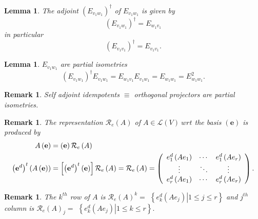 \documentclass[aps,preprint]{revtex4}%
\newtheorem{lemma}[theorem]{Lemma}
\newtheorem{remark}[theorem]{Remark}
\begin{document}
\begin{lemma}
The adjoint $\left(  E_{v_{1}w_{1}}\right)  ^{\dagger}$ of $E_{v_{1}w_{1}}$ is
given by
\begin{equation}
\left(  E_{v_{1}w_{1}}\right)  ^{\dagger}=E_{w_{1}v_{1}}%
\end{equation}
in particular
\begin{equation}
\left(  E_{v_{1}v_{1}}\right)  ^{\dagger}=E_{v_{1}v_{1}}.
\end{equation}

\end{lemma}

\begin{lemma}
$E_{v_{1}w_{1}}$ are partial isometries%
\begin{equation}
\left(  E_{v_{1}w_{1}}\right)  ^{\dagger}E_{v_{1}w_{1}}=E_{w_{1}v_{1}}%
E_{v_{1}w_{1}}=E_{w_{1}w_{1}}=E_{w_{1}w_{1}}^{2}.
\end{equation}

\end{lemma}

\begin{remark}
Self adjoint idempotents $\equiv$ orthogonal projectors are partial isometries.
\end{remark}

\begin{remark}
The representation $\mathcal{R}_{e}\left(  A\right)  $ of $A\in\mathcal{L}%
\left(  V\right)  \ wrt$ the basis $\left(  \mathbf{e}\right)  $ is produced
by
\begin{align}
A\left(  \mathbf{e}\right)   &  =\left(  \mathbf{e}\right)  \mathcal{R}%
_{e}\left(  A\right) \\
\left(  \mathbf{e}^{d}\right)  ^{t}\left(  A\left(  \mathbf{e}\right)
\right)   &  =\left[  \left(  \mathbf{e}^{d}\right)  ^{t}\left(
\mathbf{e}\right)  \right]  \mathcal{R}_{e}\left(  A\right)  =\mathcal{R}%
_{e}\left(  A\right)  =\left(
\begin{array}
[c]{ccc}%
e_{1}^{d}\left(  Ae_{1}\right)  & \cdots & e_{1}^{d}\left(  Ae_{r}\right) \\
\vdots & \ddots & \vdots\\
e_{r}^{d}\left(  Ae_{1}\right)  & \cdots & e_{r}^{d}\left(  Ae_{r}\right)
\end{array}
\right)  .
\end{align}

\end{remark}

\begin{remark}
The $k^{th}$ \emph{row} of $A$ is $\mathcal{R}_{e}\left(  A\right)  ^{k}=$
$\left\{  \left.  e_{k}^{d}\left(  Ae_{j}\right)  \right\vert 1\leq j\leq
r\right\}  $ and $j^{th}$ \emph{column} is $\mathcal{R}_{e}\left(  A\right)
_{j}=$ $\left\{  \left.  e_{k}^{d}\left(  Ae_{j}\right)  \right\vert 1\leq
k\leq r\right\}  .$
\end{remark}
\end{document}

